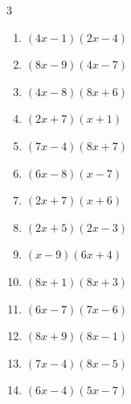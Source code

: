 \begin{multicols}{3}
\begin{enumerate}
  \item $(4x-1)(2x-4)$


  \item $(8x-9)(4x-7)$


  \item $(4x-8)(8x+6)$


\columnbreak %

\resetques

  \item $(2x+7)(x+1)$


  \item $(7x-4)(8x+7)$


  \item $(6x-8)(x-7)$


  \item $(2x+7)(x+6)$


  \item $(2x+5)(2x-3)$


  \item $(x-9)(6x+4)$


  \item $(8x+1)(8x+3)$


  \item $(6x-7)(7x-6)$


  \item $(8x+9)(8x-1)$


  \item $(7x-4)(8x-5)$


  \item $(6x-4)(5x-7)$



\end{enumerate}
\end{multicols}
